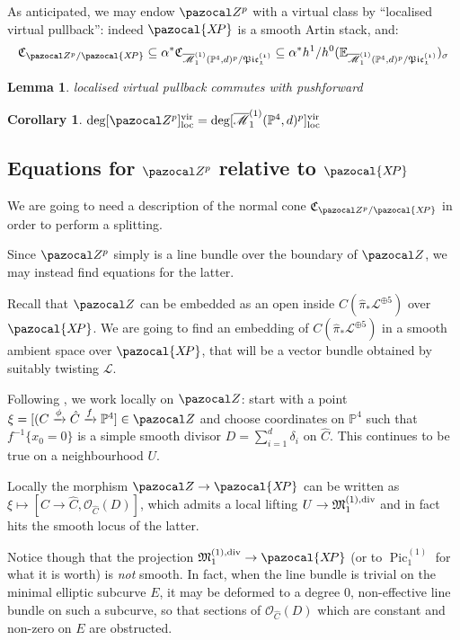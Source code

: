 \documentclass[11pt]{amsart}
\newcommand{\Mone}[3]{\overline{\mathcal M}^{(1)}_{#1}(#2,#3)}
\newcommand{\PP}{\mathbb P}
\newcommand{\OO}{\mathcal O}
\renewcommand{\to}{\rightarrow}
\newcommand{\XP}{\pazocal{X\!P}}
\newcommand{\Z}{\pazocal Z}
\newcommand{\MM}{\mathfrak M}
\newcommand{\Pic}{\operatorname{Pic}}
\theoremstyle{plain}
\newtheorem{lem}[thm]{Lemma}
\newtheorem{cor}[thm]{Corollary}
\theoremstyle{definition}
\begin{document}
As anticipated, we may endow $\Z^p$ with a virtual class by ``localised virtual pullback'': indeed $\XP$ is a smooth Artin stack, and:
\[
\mathfrak C_{\Z^p/\XP} \subseteq \alpha^*\mathfrak C_{\Mone{1}{\PP^4}{d}^p/\mathfrak{Pic_1^{(1)}}} \subseteq \alpha^* h^1/h^0(\mathbb E_{\Mone{1}{\PP^4}{d}^p/\mathfrak{Pic_1^{(1)}}})_\sigma
\]

\begin{lem}
localised virtual pullback commutes with pushforward
\end{lem}

\begin{cor}
$\deg[\Z^p]^{\rm{vir}}_{\rm{loc}}=\deg[\Mone{1}{\PP^4}{d}^p]^{\rm{vir}}_{\rm{loc}}$
\end{cor}
\subsection{Equations for $\Z^p$ relative to $\XP$}
We are going to need a description of the normal cone $\mathfrak C_{\Z^p/\XP}$ in order to perform a splitting.

Since $\Z^p$ simply is a line bundle over the boundary of $\Z$, we may instead find equations for the latter.

Recall that $\Z$ can be embedded as an open inside $C(\hat{\pi}_*\mathcal L^{\oplus 5})$ over $\XP$. We are going to find an embedding of $C(\hat{\pi}_*\mathcal L^{\oplus 5})$ in a smooth ambient space over $\XP$, that will be a vector bundle obtained by suitably twisting $\mathcal L$.

Following \cite{HL}, we work locally on $\Z$: start with a point $\xi=[(C\xrightarrow{\phi}\hat C\xrightarrow{f}\PP^4]\in\Z$ and choose coordinates on $\PP^4$ such that $f^{-1}\{x_0=0\}$ is a simple smooth divisor $D=\sum_{i=1}^d\delta_i$ on $\hat C$. This continues to be true on a neighbourhood $U$.

 Locally the morphism $\Z\to\XP$ can be written as $\xi\mapsto[C\to\hat C,\OO_{\hat C}(D)]$, which admits a local lifting $U\to\MM_1^{(1),\rm{div}}$ and in fact hits the smooth locus of the latter.
 
  Notice though that the projection $\MM_1^{(1),\rm{div}}\to \XP$ (or to $\Pic_1^{(1)}$ for what it is worth) is \emph{not} smooth. In fact, when the line bundle is trivial on the minimal elliptic subcurve $E$, it may be deformed to a degree $0$, non-effective line bundle on such a subcurve, so that sections of $\OO_{\hat C}(D)$ which are constant and non-zero on $E$ are obstructed.
\end{document}
